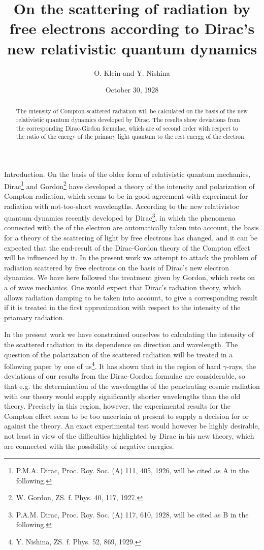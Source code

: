 \documentclass{article}
\title{On the scattering of radiation by free electrons according to Dirac's new relativistic quantum dynamics}
\date{October 30, 1928}
\author{O. Klein and Y. Nishina}
\begin{document}
\maketitle

\begin{abstract}
The intensity of Compton-scattered radiation will be calculated on the basis of the new relativistic quantum dynamics developed by Dirac. The results show deviations from the corresponding Dirac-Girdon formulae, which are of second order with respect to the ratio of the energy of the primary light quantum to the rest energg of the electron.
\end{abstract}

Introduction. On the basis of the older form of relativistic quantum mechanics, Dirac\footnote{P.M.A. Dirac, Proc. Roy. Soc. (A) 111, 405, 1926, will be cited as A in the following.} and Gordon\footnote{W. Gordon, ZS. f. Phys. 40, 117, 1927.} have developed a theory of the intensity and polarization of Compton radiation, which seems to be in good agreement with experiment for radiation with not-too-short wavelengths. According to the new relativistoc quantum dynamics recently developed by Dirac\footnote{P.A.M. Dirac, Proc. Roy. Soc. (A) 117, 610, 1928, will be cited as B in the following.}, in which the phenomena connected with the  of the electron are automatically taken into account, the basis for a theory of the scattering of light by free electrons has changed, and it can be expected that the end-result of the Dirac-Gordon theory of the Compton effect will be influenced by it. In the present work we attempt to attack the problem of radiation scattered by free electrons on the basis of Dirac's new electron dynamics. We have here followed the treatment given by Gordon, which rests on a  of wave mechanics. One would expect that Dirac's radiation theory, which allows radiation damping to be taken into account, to give a corresponding result if it is treated in the first approximation with respect to the intensity of the priamary radiation.

In the present work we have constrained ourselves to calculating the intensity of the scattered radiation in its dependence on direction and wavelength. The question of the polarization of the scattered radiation will be treated in a following paper by one of us\footnote{Y. Nishina, ZS. f. Phys. 52, 869, 1929.}. It has shown that in the region of hard $\gamma$-rays, the deviations of our results from the Dirac-Gordon formulae are considerable, so that e.g. the determination of the wavelengths of the penetrating cosmic radiation with our theory would supply significantly shorter wavelengths than the old theory. Precisely in this region, however, the experimental results for the Compton effect seem to be too uncertain at present to supply a decision for or against the theory. An exact experimental test would however be highly desirable, not least in view of the difficulties highlighted by Dirac in his new theory, which are connected with the possibility of negative energies.
\end{document}
